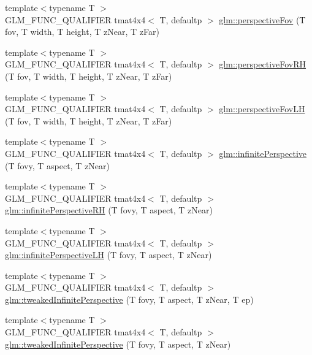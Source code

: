 \begin{DoxyCompactItemize}
\item 
{\footnotesize template$<$typename T $>$ }\\G\+L\+M\+\_\+\+F\+U\+N\+C\+\_\+\+Q\+U\+A\+L\+I\+F\+I\+ER tmat4x4$<$ T, defaultp $>$ \hyperlink{group__gtc__matrix__transform_gae9146e2c550fc8646299e4b900238145}{glm\+::perspective\+Fov} (T fov, T width, T height, T z\+Near, T z\+Far)
\item 
{\footnotesize template$<$typename T $>$ }\\G\+L\+M\+\_\+\+F\+U\+N\+C\+\_\+\+Q\+U\+A\+L\+I\+F\+I\+ER tmat4x4$<$ T, defaultp $>$ \hyperlink{group__gtc__matrix__transform_ga07cd8df791bf90dcb782645fe0b21261}{glm\+::perspective\+Fov\+RH} (T fov, T width, T height, T z\+Near, T z\+Far)
\item 
{\footnotesize template$<$typename T $>$ }\\G\+L\+M\+\_\+\+F\+U\+N\+C\+\_\+\+Q\+U\+A\+L\+I\+F\+I\+ER tmat4x4$<$ T, defaultp $>$ \hyperlink{group__gtc__matrix__transform_gae705a2f19c3ef5ef880bd6c92759cf2d}{glm\+::perspective\+Fov\+LH} (T fov, T width, T height, T z\+Near, T z\+Far)
\item 
{\footnotesize template$<$typename T $>$ }\\G\+L\+M\+\_\+\+F\+U\+N\+C\+\_\+\+Q\+U\+A\+L\+I\+F\+I\+ER tmat4x4$<$ T, defaultp $>$ \hyperlink{group__gtc__matrix__transform_ga79f704ad91a5f0d68abd88c66c8186e5}{glm\+::infinite\+Perspective} (T fovy, T aspect, T z\+Near)
\item 
{\footnotesize template$<$typename T $>$ }\\G\+L\+M\+\_\+\+F\+U\+N\+C\+\_\+\+Q\+U\+A\+L\+I\+F\+I\+ER tmat4x4$<$ T, defaultp $>$ \hyperlink{group__gtc__matrix__transform_ga79575023763df88dff1bf8255a42d0be}{glm\+::infinite\+Perspective\+RH} (T fovy, T aspect, T z\+Near)
\item 
{\footnotesize template$<$typename T $>$ }\\G\+L\+M\+\_\+\+F\+U\+N\+C\+\_\+\+Q\+U\+A\+L\+I\+F\+I\+ER tmat4x4$<$ T, defaultp $>$ \hyperlink{group__gtc__matrix__transform_ga47af534da2b28effa4c7945ec82ccd9d}{glm\+::infinite\+Perspective\+LH} (T fovy, T aspect, T z\+Near)
\item 
{\footnotesize template$<$typename T $>$ }\\G\+L\+M\+\_\+\+F\+U\+N\+C\+\_\+\+Q\+U\+A\+L\+I\+F\+I\+ER tmat4x4$<$ T, defaultp $>$ \hyperlink{group__gtc__matrix__transform_gaa50fce7f50b5d5da881ed30f5532a921}{glm\+::tweaked\+Infinite\+Perspective} (T fovy, T aspect, T z\+Near, T ep)
\item 
{\footnotesize template$<$typename T $>$ }\\G\+L\+M\+\_\+\+F\+U\+N\+C\+\_\+\+Q\+U\+A\+L\+I\+F\+I\+ER tmat4x4$<$ T, defaultp $>$ \hyperlink{group__gtc__matrix__transform_gaed64bd81f5ecdab52fecbdf7f6b58194}{glm\+::tweaked\+Infinite\+Perspective} (T fovy, T aspect, T z\+Near)

\end{DoxyCompactItemize}
